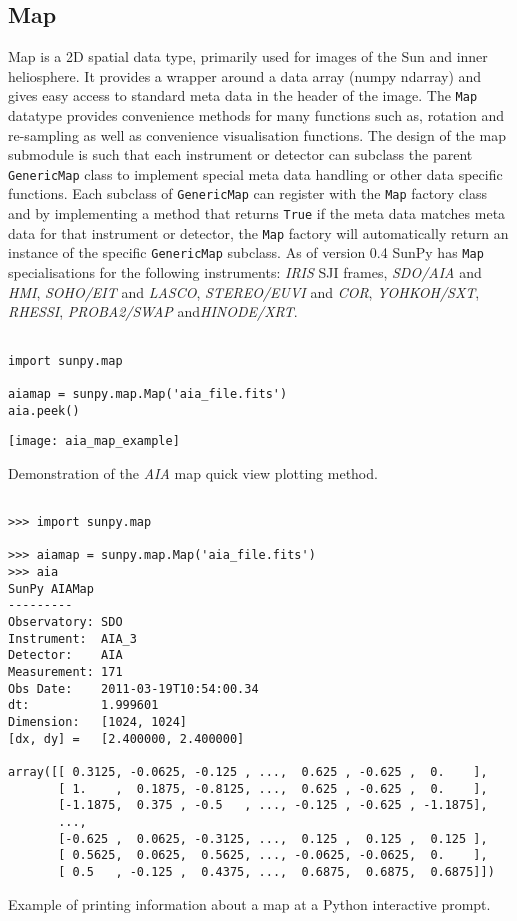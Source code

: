 \subsection{Map}
Map is a 2D spatial data type, primarily used for images of the Sun and 
inner heliosphere. It provides a wrapper around a data array (numpy 
ndarray) and gives easy access to standard meta data in the header of the 
image.
The \texttt{Map} datatype provides convenience methods for many functions 
such as, rotation and re-sampling as well as convenience visualisation 
functions.
The design of the map submodule is such that each instrument or 
detector can subclass the parent \texttt{GenericMap} class to implement 
special meta data handling or other data specific functions. Each subclass 
of \texttt{GenericMap} can register with the \texttt{Map} factory class and 
by implementing a method that returns \texttt{True} if the meta data 
matches meta data for that instrument or detector, the \texttt{Map} factory 
will automatically return an instance of the specific \texttt{GenericMap} 
subclass. As of version 0.4 SunPy has \texttt{Map} specialisations for the 
following instruments: \textit{IRIS} SJI frames, \textit{SDO/AIA} and 
\textit{HMI}, \textit{SOHO/EIT} and 	\textit{LASCO}, 
\textit{STEREO/EUVI} 	and \textit{COR}, \textit{YOHKOH/SXT}, 
\textit{RHESSI}, \textit{PROBA2/SWAP} and\textit{HINODE/XRT}.

\begin{listing}
\begin{verbatim}

import sunpy.map

aiamap = sunpy.map.Map('aia_file.fits')
aia.peek()
\end{verbatim}
\texttt{[image: aia\_map\_example]}
\caption{Demonstration of the \textit{AIA} map quick view plotting method.}
\label{code:aia_1}
\end{listing}

\begin{listing}
\begin{verbatim}

>>> import sunpy.map

>>> aiamap = sunpy.map.Map('aia_file.fits')
>>> aia
SunPy AIAMap
---------
Observatory: SDO
Instrument:  AIA_3
Detector:    AIA
Measurement: 171
Obs Date:    2011-03-19T10:54:00.34
dt:          1.999601
Dimension:   [1024, 1024]
[dx, dy] =   [2.400000, 2.400000]

array([[ 0.3125, -0.0625, -0.125 , ...,  0.625 , -0.625 ,  0.    ],
       [ 1.    ,  0.1875, -0.8125, ...,  0.625 , -0.625 ,  0.    ],
       [-1.1875,  0.375 , -0.5   , ..., -0.125 , -0.625 , -1.1875],
       ..., 
       [-0.625 ,  0.0625, -0.3125, ...,  0.125 ,  0.125 ,  0.125 ],
       [ 0.5625,  0.0625,  0.5625, ..., -0.0625, -0.0625,  0.    ],
       [ 0.5   , -0.125 ,  0.4375, ...,  0.6875,  0.6875,  0.6875]])

\end{verbatim}
\caption{Example of printing information about a map at a Python interactive 
prompt.}
\label{code:aia_2}
\end{listing}

